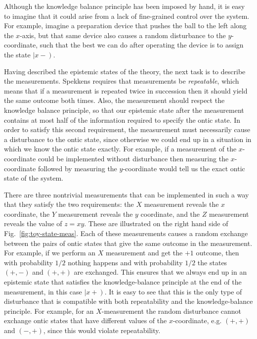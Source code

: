 \documentclass[DIV=calc,paper=a4,fontsize=11pt,twocolumn]{scrartcl} %
\theoremstyle{definition}
\theoremstyle{plain}
\newcommand{\RKet}[1]{\ensuremath{\left \vert #1 \right )}}
\begin{document}
Although the knowledge balance principle has been imposed by hand, it
is easy to imagine that it could arise from a lack of fine-grained
control over the system.  For example, imagine a preparation device
that pushes the ball to the left along the $x$-axis, but that same
device also causes a random disturbance to the $y$-coordinate, such
that the best we can do after operating the device is to assign the
state $\RKet{x-}$.

Having described the epistemic states of the theory, the next task is
to describe the measurements.  Spekkens requires that measurements be
\emph{repeatable}, which means that if a measurement is repeated twice
in succession then it should yield the same outcome both times.  Also,
the measurement should respect the knowledge balance principle, so
that our epistemic state after the measurement contains at most half
of the information required to specify the ontic state.  In order to
satisfy this second requirement, the measurement must necessarily
cause a disturbance to the ontic state, since otherwise we could end
up in a situation in which we know the ontic state exactly.  For
example, if a measurement of the $x$-coordinate could be implemented
without disturbance then measuring the $x$-coordinate followed by
measuring the $y$-coordinate would tell us the exact ontic state of
the system.

There are three nontrivial measurements that can be implemented in
such a way that they satisfy the two requirements: the $X$ measurement
reveals the $x$ coordinate, the $Y$ measurement reveals the $y$
coordinate, and the $Z$ measurement reveals the value of $z=xy$.
These are illustrated on the right hand side of
Fig.~\ref{fig:toy-state-meas}.  Each of these measurements causes a
random exchange between the pairs of ontic states that give the same
outcome in the measurement.  For example, if we perform an $X$
measurement and get the $+1$ outcome, then with probability $1/2$
nothing happens and with probability $1/2$ the states $(+,-)$ and
$(+,+)$ are exchanged.  This ensures that we always end up in an
epistemic state that satisfies the knowledge-balance principle at the
end of the measurement, in this case $\RKet{x+}$.  It is easy to see
that this is the only type of disturbance that is compatible with both
repeatability and the knowledge-balance principle.  For example, for
an $X$-measurement the random disturbance cannot exchange ontic states
that have different values of the $x$-coordinate, e.g. $(+,+)$ and
$(-,+)$, since this would violate repeatability.
\end{document}
